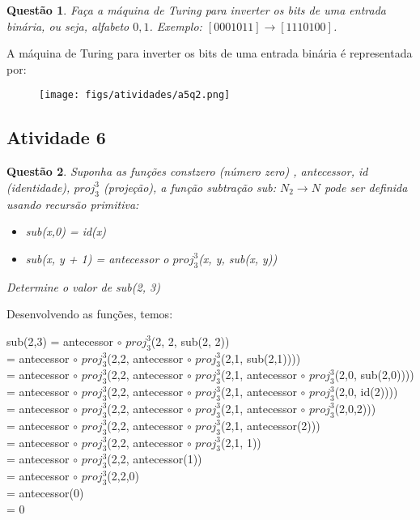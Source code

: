 \documentclass{article}
\newtheorem{problem}{Questão}
\begin{document}
\begin{problem} Faça a máquina de Turing para inverter os bits de uma entrada binária, ou seja, alfabeto ${0,1}$. Exemplo:
$[0001011] \rightarrow [1110100]$.
\end{problem}

\begin{solution} A máquina de Turing para inverter os bits de uma entrada binária é representada por:

\begin{figure}[H]
        \centering
        \texttt{[image: figs/atividades/a5q2.png]}
\end{figure}

\end{solution}


\subsection{Atividade 6}
\begin{problem} Suponha as funções constzero (número zero) , antecessor, id (identidade), $proj^{3}_{3}$ (projeção), a
função subtração sub: $N_2 \rightarrow N$ pode ser definida usando recursão primitiva:
\begin{itemize}
    \item sub(x,0) = id(x)
    \item sub(x, y + 1) = antecessor o $proj^{3}_{3}$(x, y, sub(x, y))
\end{itemize}
Determine o valor de sub(2, 3)
\end{problem}
\begin{solution}
Desenvolvendo as funções, temos:

sub(2,3) = antecessor $\circ$ $proj^{3}_{3}$(2, 2, sub(2, 2))\\
= antecessor $\circ$ $proj^{3}_{3}$(2,2, antecessor $\circ$ $proj^{3}_{3}$(2,1, sub(2,1))))\\
= antecessor $\circ$ $proj^{3}_{3}$(2,2, antecessor $\circ$ $proj^{3}_{3}$(2,1, antecessor $\circ$ $proj^{3}_{3}$(2,0, sub(2,0))))\\
= antecessor $\circ$ $proj^{3}_{3}$(2,2, antecessor $\circ$ $proj^{3}_{3}$(2,1, antecessor $\circ$ $proj^{3}_{3}$(2,0, id(2))))\\
= antecessor $\circ$ $proj^{3}_{3}$(2,2, antecessor $\circ$ $proj^{3}_{3}$(2,1, antecessor $\circ$ $proj^{3}_{3}$(2,0,2)))\\
= antecessor $\circ$ $proj^{3}_{3}$(2,2, antecessor $\circ$ $proj^{3}_{3}$(2,1, antecessor(2)))\\
= antecessor $\circ$ $proj^{3}_{3}$(2,2, antecessor $\circ$ $proj^{3}_{3}$(2,1, 1))\\
= antecessor $\circ$ $proj^{3}_{3}$(2,2, antecessor(1))\\
= antecessor $\circ$ $proj^{3}_{3}$(2,2,0)\\
= antecessor(0)\\
= 0\\
\end{solution}
\end{document}
